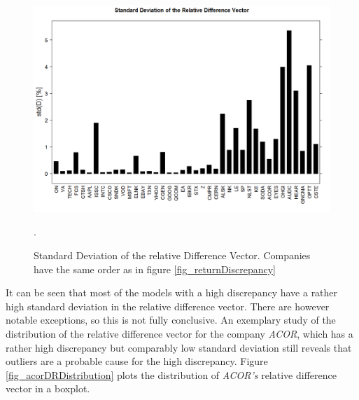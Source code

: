 \begin{figure}[h]
	\centering
  	\includegraphics[width=\textwidth]{stdDiscrepancy}
	\caption[Standard Deviation of the Relative Difference Vectors]{Standard Deviation of the relative Difference Vector. Companies have the same order as in figure \ref{fig_returnDiscrepancy}}.
	\label{fig_stdDiscrepancy}
\end{figure}

It can be seen that most of the models with a high discrepancy have a rather high standard deviation in the relative difference vector. There are however notable exceptions, so this is not fully conclusive. An exemplary study of the distribution of the relative difference vector for the company \textit{ACOR}, which has a rather high discrepancy but comparably low standard deviation still reveals that outliers are a probable cause for the high discrepancy. Figure \ref{fig_acorDRDistribution} plots the distribution of \textit{ACOR's} relative difference vector in a boxplot.

